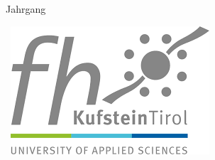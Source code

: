 
\begin{titlepage} 
	\thispagestyle{empty}
	\setcounter{page}{-2}

\begin{center}
	\hspace{1cm}
\vfill

\begin{minipage}{0.99\textwidth}
\begin{center}
\onehalfspacing
\Huge \textsf{\textbf{\mytitle}}
\end{center}
\end{minipage}

\vfill
	\hspace{1cm} \\ \vspace{2em}
\vfill
	\hspace{1cm} \\ \vspace{2em}
\vfill

\textbf{\textsf{\LARGE{%
\autor \\
\arbeit \\
}}}%

\vspace{1em}
\LARGE{%
Jahrgang \jahrgang \\
}%

\end{center}

	\newpage
	\thispagestyle{empty}
	\hspace{1cm}
	\newpage
	\thispagestyle{empty}
\begin{center}

\mbox{
		\includegraphics[width=0.3\linewidth]{content/fh_logo}
}


\end{center}
\end{titlepage}
